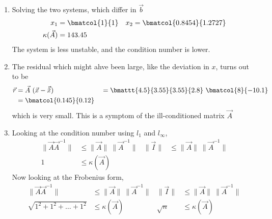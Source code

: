 \begin{enumerate}
    \item Solving the two systems, which differ in $ \vec{b} $
          \begin{align}
              x_1             & = \bmatcol{1}{1} & x_2 & = \bmatcol{0.8454}{1.2727} \\
              \kappa(\vec{A}) & = 143.45
          \end{align}
          The system is less unstable, and the condition number is lower.

    \item The residual which might ahve been large, like the deviation in $ x $, turns
          out to be
          \begin{align}
              \vec{r} & = \vec{A}\ (\vec{x} - \vec{\tilde{x}})              &
                      & = \bmattt{4.5}{3.55}{3.55}{2.8}\ \bmatcol{8}{-10.1}   \\
                      & = \bmatcol{0.145}{0.12}
          \end{align}
          which is very small. This is a symptom of the ill-conditioned matrix
          $ \vec{A} $

    \item Looking at the condition number using $ l_1 $ and $ l_\infty $,
          \begin{align}
              \lVert \vec{A} \vec{A}^{-1} \rVert & \leq \lVert \vec{A} \rVert
              \ \lVert \vec{A}^{-1} \rVert       &
              \lVert \vec{I} \rVert              & \leq \lVert \vec{A} \rVert
              \ \lVert \vec{A}^{-1} \rVert                                    \\
              1                                  & \leq \kappa(\vec{A})
          \end{align}
          Now looking at the Frobenius form,
          \begin{align}
              \lVert \vec{A} \vec{A}^{-1} \rVert & \leq \lVert \vec{A} \rVert
              \ \lVert \vec{A}^{-1} \rVert       &
              \lVert \vec{I} \rVert              & \leq \lVert \vec{A} \rVert
              \ \lVert \vec{A}^{-1} \rVert                                      \\
              \sqrt{1^2 + 1^2 + \dots + 1^2}     & \leq \kappa(\vec{A})       &
              \sqrt{n}                           & \leq \kappa(\vec{A})
          \end{align}


\end{enumerate}
